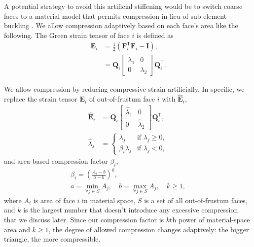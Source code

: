 \documentclass[10pt,journal,compsoc,twoside]{TexInputs/IEEEtran}
\begin{document}
A potential strategy to avoid this artificial stiffening would be to switch coarse faces
to a material model that permits compression in lieu of sub-element buckling
\cite{Choi:2002:SBR,Wang:2010:MIS}. We allow compression adaptively based on each face's
area like the following. The Green strain tensor of face $i$ is defined as
\begin{align}
  \textbf{E}_i &= \frac{1}{2}(\textbf{F}^\mathsf{T}_i \textbf{F}_i - \textbf{I}), \\
               &= \textbf{Q}_i \begin{bmatrix}\lambda_1 & 0 \\ 0 & \lambda_2\end{bmatrix}
  \textbf{Q}^\mathsf{T}_i.
\end{align}

We allow compression by reducing compressive strain artificially. In specific, we replace
the strain tensor $\textbf{E}_i$ of out-of-frustum face $i$ with
$\hat{\textbf{E}}_i$,
\begin{align}
  \hat{\textbf{E}}_i &= \textbf{Q}_i \begin{bmatrix}\hat\lambda_1 & 0 \\ 0 &
\hat\lambda_2\end{bmatrix} \textbf{Q}^\mathsf{T}_i, \\
  \hat\lambda_j &=
  \begin{cases}
    \lambda_j & \text{if } \lambda_j \geq 0, \\
    \beta_i\lambda_j & \text{if } \lambda_j < 0,
  \end{cases}
\end{align}
and area-based compression factor $\beta_i$,
\begin{gather}
  \beta_i = \left(\frac{A_i - b}{a - b}\right)^k, \\
  a = \min_{\forall j \in S} A_j,\quad b = \max_{\forall j \in S} A_j,\quad k \ge 1,
\end{gather}
where $A_i$ is area of face $i$ in material space, $S$ is a set of all out-of-frustum
faces, and $k$ is the largest number that doesn't introduce any excessive compression that
we discuss later. Since our compression factor is $k$th power of material-space area and
$k \geq 1$, the degree of allowed compression changes adaptively: the bigger triangle, the
more compressible.
\end{document}
